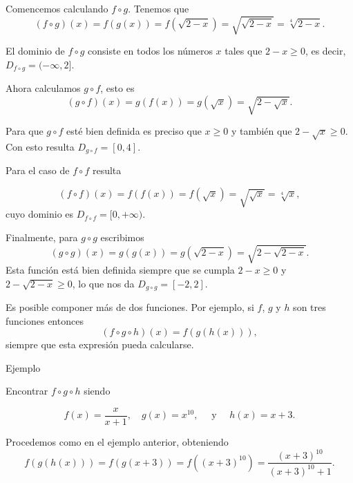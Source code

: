 \documentclass[
  letterpaper,
]{book}
\theoremstyle{plain}
\theoremstyle{remark}
\begin{document}
\begin{tcolorbox}[enhanced jigsaw, opacityback=0, left=2mm, opacitybacktitle=0.6, toprule=.15mm, bottomrule=.15mm, colbacktitle=quarto-callout-tip-color!10!white, titlerule=0mm, bottomtitle=1mm, title=\textcolor{quarto-callout-tip-color}{\faLightbulb}\hspace{0.5em}{Solución}, toptitle=1mm, colframe=quarto-callout-tip-color-frame, colback=white, breakable, rightrule=.15mm, arc=.35mm, leftrule=.75mm, coltitle=black]

Comencemos calculando \(f\circ g\). Tenemos que \[
(f\circ g)(x)=f(g(x))=f\left(\sqrt{2-x}\right)=\sqrt{\sqrt{2-x}}=\sqrt[4]{2-x}.
\]

El dominio de \(f\circ g\) consiste en todos los números \(x\) tales que
\(2-x\geq 0\), es decir, \(D_{f\circ g}=(-\infty,2]\).

Ahora calculamos \(g\circ f\), esto es \[
(g\circ f)(x)=g(f(x))=g\left(\sqrt{x}\right)=\sqrt{2-\sqrt{x}}.
\]

Para que \(g\circ f\) esté bien definida es preciso que \(x\geq 0\) y
también que \(2-\sqrt{x}\geq 0\). Con esto resulta
\(D_{g\circ f}=[0,4]\).

Para el caso de \(f\circ f\) resulta

\[
(f\circ f)(x)=f(f(x))=f\left(\sqrt{x}\right)=\sqrt{\sqrt{x}}=\sqrt[4]{x},
\] cuyo dominio es \(D_{f\circ f}=[0,+\infty)\).

Finalmente, para \(g\circ g\) escribimos \[
(g\circ g)(x)=g(g(x))=g\left(\sqrt{2-x}\right)=\sqrt{2-\sqrt{2-x}}.
\] Esta función está bien definida siempre que se cumpla \(2-x\geq 0\) y
\(2-\sqrt{2-x}\geq 0\), lo que nos da \(D_{g\circ g}=[-2,2]\).

\end{tcolorbox}

Es posible componer más de dos funciones. Por ejemplo, si \(f\), \(g\) y
\(h\) son tres funciones entonces \[
(f\circ g\circ h)(x)=f(g(h(x))),
\] siempre que esta expresión pueda calcularse.

Ejemplo

Encontrar \(f\circ g\circ h\) siendo

\[
f(x)=\frac{x}{x+1},\quad g(x)=x^{10},\quad \text{ y }\quad h(x)=x+3.
\]

\begin{tcolorbox}[enhanced jigsaw, opacityback=0, left=2mm, opacitybacktitle=0.6, toprule=.15mm, bottomrule=.15mm, colbacktitle=quarto-callout-tip-color!10!white, titlerule=0mm, bottomtitle=1mm, title=\textcolor{quarto-callout-tip-color}{\faLightbulb}\hspace{0.5em}{Solución}, toptitle=1mm, colframe=quarto-callout-tip-color-frame, colback=white, breakable, rightrule=.15mm, arc=.35mm, leftrule=.75mm, coltitle=black]

Procedemos como en el ejemplo anterior, obteniendo \[
f(g(h(x)))=f(g(x+3))=f\left((x+3)^{10}\right)=\frac{(x+3)^{10}}{(x+3)^{10}+1}.
\]

\end{tcolorbox}
\end{document}
